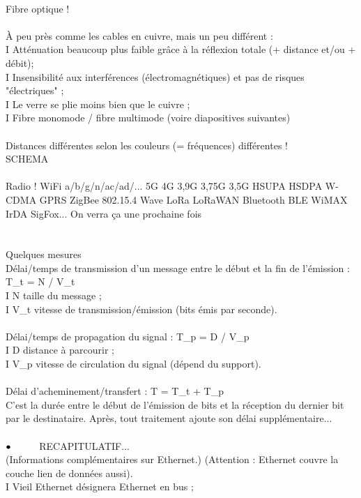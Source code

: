 \documentclass[5pt]{article}
\newcommand\tab[1][1cm]{\hspace*{#1}}
\begin{document}
\begin{scriptsize}
\\
Fibre optique !\\
\\
À peu près comme les cables en cuivre, mais un peu différent :\\
I Atténuation beaucoup plus faible grâce à la réflexion totale (+ distance et/ou + débit);\\
I Insensibilité aux interférences (électromagnétiques) et pas de risques "électriques" ;\\
I Le verre se plie moins bien que le cuivre ;\\
I Fibre monomode / fibre multimode (voire diapositives suivantes)\\
\\
Distances différentes selon les couleurs (= fréquences) différentes !\\
SCHEMA\\
\\
Radio ! WiFi a/b/g/n/ac/ad/... 5G 4G 3,9G 3,75G 3,5G HSUPA HSDPA W-CDMA GPRS ZigBee 802.15.4 Wave LoRa LoRaWAN Bluetooth BLE WiMAX IrDA SigFox... On verra ça une prochaine fois\\
\\
\\
Quelques mesures\\
Délai/temps de transmission d’un message entre le début et la fin de l’émission : T\_t = N / V\_t\\
I N taille du message ;\\
I V\_t vitesse de transmission/émission (bits émis par seconde).\\
\\
Délai/temps de propagation du signal : T\_p = D / V\_p\\
I D distance à parcourir ;\\
I V\_p vitesse de circulation du signal (dépend du support).\\
\\
Délai d’acheminement/transfert : T = T\_t + T\_p\\
C’est la durée entre le début de l’émission de bits et la réception du dernier bit par le destinataire. Après, tout traitement ajoute son délai supplémentaire...\\
\\$\bullet\tab$RECAPITULATIF...\\
(Informations complémentaires sur Ethernet.) (Attention : Ethernet couvre la couche lien de données aussi).\\
I Vieil Ethernet désignera Ethernet en bus ;\\

\end{scriptsize}
\end{document}
